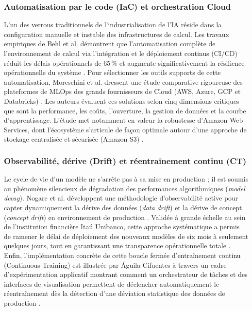 \subsubsection{Automatisation par le code (IaC) et orchestration Cloud}
L'un des verrous traditionnels de l'industrialisation de l'IA réside dans la configuration manuelle et instable des infrastructures de calcul. Les travaux empiriques de Behl et al. démontrent que l'automatisation complète de l'environnement de calcul via l'intégration et le déploiement continus (CI/CD) réduit les délais opérationnels de 65\,\% et augmente significativement la résilience opérationnelle du système \cite{92}. Pour sélectionner les outils supports de cette automatisation, Moreschini et al. dressent une étude comparative rigoureuse des plateformes de MLOps des grands fournisseurs de Cloud (AWS, Azure, GCP et Databricks) \cite{93}. Les auteurs évaluent ces solutions selon cinq dimensions critiques que sont la performance, les coûts, l'ouverture, la gestion de données et la courbe d'apprentissage. L'étude met notamment en valeur la robustesse d'Amazon Web Services, dont l'écosystème s'articule de façon optimale autour d'une approche de stockage centralisée et sécurisée (Amazon S3) \cite{93}.

\subsubsection{Observabilité, dérive (Drift) et réentraînement continu (CT)}
Le cycle de vie d'un modèle ne s'arrête pas à sa mise en production ; il est soumis au phénomène silencieux de dégradation des performances algorithmiques (\textit{model decay}). Nogare et al. développent une méthodologie d'observabilité active pour capter dynamiquement la dérive des données (\textit{data drift}) et la dérive de concept (\textit{concept drift}) en environnement de production \cite{91}. Validée à grande échelle au sein de l'institution financière Itaú Unibanco, cette approche systématique a permis de ramener le délai de déploiement des nouveaux modèles de six mois à seulement quelques jours, tout en garantissant une transparence opérationnelle totale \cite{91}. Enfin, l'implémentation concrète de cette boucle fermée d'entraînement continu (Continuous Training) est illustrée par Águila Cifuentes à travers un cadre d'expérimentation applicatif montrant comment un orchestrateur de tâches et des interfaces de visualisation permettent de déclencher automatiquement le réentraînement dès la détection d'une déviation statistique des données de production \cite{95}.


